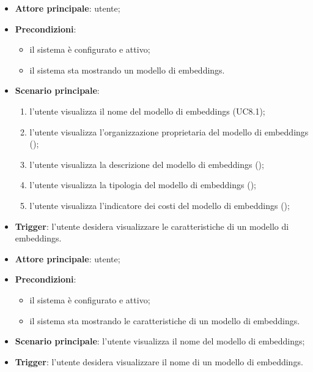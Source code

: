 \documentclass[10pt, a4paper]{article}
\begin{document}
    
    \begin{itemize}
        \item \textbf{Attore principale}: utente;
        \item \textbf{Precondizioni}:
            \begin{itemize}
                \item il sistema è configurato e attivo;
                \item il sistema sta mostrando un modello di embeddings.
            \end{itemize}
        \item \textbf{Scenario principale}:
            \begin{enumerate}
                \item l'utente visualizza il nome del modello di embeddings (UC8.1);
                \item l'utente visualizza l'organizzazione proprietaria del modello di embeddings ();
                \item l'utente visualizza la descrizione del modello di embeddings ();
                \item l'utente visualizza la tipologia del modello di embeddings ();
                \item l'utente visualizza l'indicatore dei costi del modello di embeddings ();
            \end{enumerate}
        \item \textbf{Trigger}: l’utente desidera visualizzare le caratteristiche di un modello di embeddings.
    \end{itemize}

    \begin{itemize}
        \item \textbf{Attore principale}: utente;
        \item \textbf{Precondizioni}:
            \begin{itemize}
                \item il sistema è configurato e attivo;
                \item il sistema sta mostrando le caratteristiche di un modello di embeddings.
            \end{itemize}
        \item \textbf{Scenario principale}: l'utente visualizza il nome del modello di embeddings;
        \item \textbf{Trigger}: l’utente desidera visualizzare il nome di un modello di embeddings.
    \end{itemize}
\end{document}

